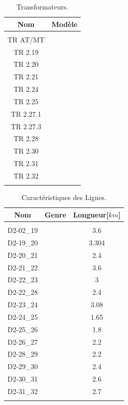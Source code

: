 \vspace{-.5cm}
\begin{table}[H]
	\captionsetup{justification=centering,margin=2cm}
	\caption{Transformateurs.}
	\label{tab:Transformateurs}
	\centering
	\begin{tabular}{cc}
		\hline
		Nom&Modèle\\
		\hline\\
		TR AT/MT&\trafoi\\
		TR 2.19&\trafoiv\\
		TR 2.20&\trafoiii\\
		TR 2.21&\trafoiii\\
		TR 2.24&\trafoiii\\
		TR 2.25&\trafoiii\\
		TR 2.27.1&\trafoiv\\
		TR 2.27.3&\trafoiv\\
		TR 2.28&\trafoii\\
		TR 2.30&\trafoiv\\
		TR 2.31&\trafoiii\\
		TR 2.32&\trafoiii\\
		\hline\\
	\end{tabular}
\end{table}	
\vspace{-.5cm}
\begin{table}[H]
	\captionsetup{justification=centering,margin=2cm}
	\caption{Caractéristiques des Lignes.}
	\label{tab:Caractéristiques_des_Lignes}
	\centering
	\begin{tabular}{ccc}
		\hline
		Nom&Genre&Longueur[$ km $]\\
		\hline\\
		D2-02\_19&\cablei&3.6\\
		D2-19\_20	&\cablei&3.304\\
		D2-20\_21	&\cableiii&2.4\\
		D2-21\_22	&\cableiii&3.6\\
		D2-22\_23	&\cableiii&3\\
		D2-22\_28	&\cableii&2.4\\
		D2-23\_24	&\cableiii&3.08\\
		D2-24\_25	&\cableiii&1.65\\
		D2-25\_26	&\cableiii&1.8\\
		D2-26\_27	&\cableiii&2.2\\
		D2-28\_29	&\cableii&2.2\\
		D2-29\_30	&\cableii&2.4\\
		D2-30\_31	&\cableii&2.6\\
		D2-31\_32	&\cableii&2.7\\
		\hline\\
	\end{tabular}
\end{table}
